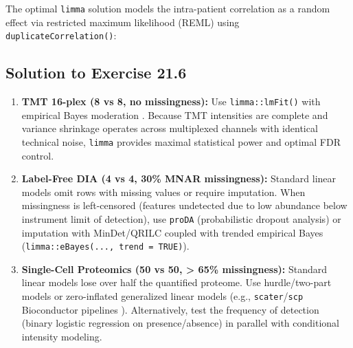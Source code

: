\documentclass[11pt,twoside,openright]{book}
\begin{document}
The optimal \texttt{limma} solution models the intra-patient correlation as a random effect via restricted maximum likelihood (REML) using \texttt{duplicateCorrelation()}:


\subsection*{Solution to Exercise 21.6}
\begin{enumerate}
    \item \textbf{TMT 16-plex (8 vs 8, no missingness):} Use \texttt{limma::lmFit()} with empirical Bayes moderation \cite{smyth2004linear, ritchie2015limma}. Because TMT intensities are complete and variance shrinkage operates across multiplexed channels with identical technical noise, \texttt{limma} provides maximal statistical power and optimal FDR control.
    \item \textbf{Label-Free DIA (4 vs 4, 30\% MNAR missingness):} Standard linear models omit rows with missing values or require imputation. When missingness is left-censored (features undetected due to low abundance below instrument limit of detection), use \texttt{proDA} (probabilistic dropout analysis) \cite{ahlmann2020proda} or imputation with MinDet/QRILC \cite{lazar2016accounting} coupled with trended empirical Bayes (\texttt{limma::eBayes(..., trend = TRUE)}).
    \item \textbf{Single-Cell Proteomics (50 vs 50, > 65\% missingness):} Standard linear models lose over half the quantified proteome. Use hurdle/two-part models or zero-inflated generalized linear models (e.g., \texttt{scater}/\texttt{scp} Bioconductor pipelines \cite{vanderaa2023scp}). Alternatively, test the frequency of detection (binary logistic regression on presence/absence) in parallel with conditional intensity modeling.
\end{enumerate}
\end{document}
